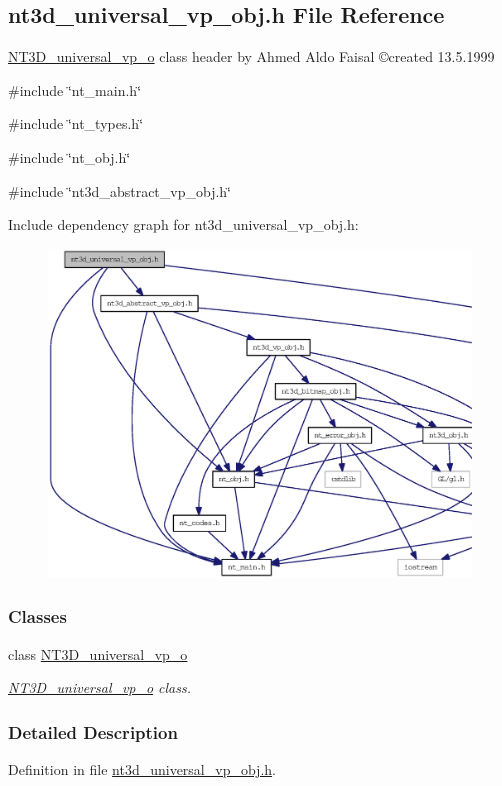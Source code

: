 \subsection{nt3d\_\-universal\_\-vp\_\-obj.h File Reference}
\label{nt3d__universal__vp__obj_8h}



\begin{DoxyItemize}
\item \hyperlink{class_n_t3_d__universal__vp__o}{NT3D\_\-universal\_\-vp\_\-o} class header by Ahmed Aldo Faisal \copyright created 13.5.1999 
\end{DoxyItemize} 


{\ttfamily \#include \char`\"{}nt\_\-main.h\char`\"{}}\par
{\ttfamily \#include \char`\"{}nt\_\-types.h\char`\"{}}\par
{\ttfamily \#include \char`\"{}nt\_\-obj.h\char`\"{}}\par
{\ttfamily \#include \char`\"{}nt3d\_\-abstract\_\-vp\_\-obj.h\char`\"{}}\par
Include dependency graph for nt3d\_\-universal\_\-vp\_\-obj.h:
\nopagebreak
\begin{figure}[H]
\begin{center}
\leavevmode
\includegraphics[width=400pt]{nt3d__universal__vp__obj_8h__incl}
\end{center}
\end{figure}
\subsubsection*{Classes}
\begin{DoxyCompactItemize}
\item 
class \hyperlink{class_n_t3_d__universal__vp__o}{NT3D\_\-universal\_\-vp\_\-o}
\begin{DoxyCompactList}\small\item\em \hyperlink{class_n_t3_d__universal__vp__o}{NT3D\_\-universal\_\-vp\_\-o} class. \item\end{DoxyCompactList}\end{DoxyCompactItemize}


\subsubsection{Detailed Description}


Definition in file \hyperlink{nt3d__universal__vp__obj_8h_source}{nt3d\_\-universal\_\-vp\_\-obj.h}.

